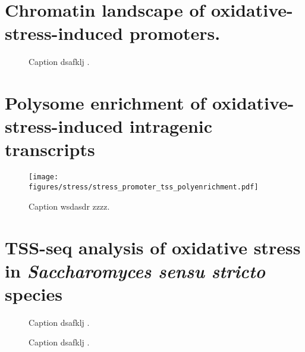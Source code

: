 \section{Chromatin landscape of oxidative-stress-induced promoters.}

\lipsum[1]

\begin{figure}
\caption[A figure showing TSS-seq, TFIIB ChIP-nexus, and MNase-ChIP-seq for the oxidative-stress-induced promoters.]{Caption dsafklj .}
\end{figure}

\section{Polysome enrichment of oxidative-stress-induced intragenic transcripts}

\lipsum[1]

\begin{figure}
\texttt{[image: figures/stress/stress\_promoter\_tss\_polyenrichment.pdf]}
\caption[Polysome enrichment in oxidative stress, for oxidative-stress-induced genic and intragenic promoters.]{Caption wsdasdr zzzz.}
\label{fig:stress_promoter_tss_polyenrichment}
\end{figure}

\section{TSS-seq analysis of oxidative stress in \textit{Saccharomyces sensu stricto} species}

\lipsum[1]

\begin{figure}
\caption[A figure showing TSS-seq coverage over oxidative-stress-induced TSSs in the three species.]{Caption dsafklj .}
\end{figure}

\begin{figure}
\caption[A figure showing TSS-seq coverage over DSK2 in the three species, possibly with the corresponding northern blot.]{Caption dsafklj .}
\end{figure}

